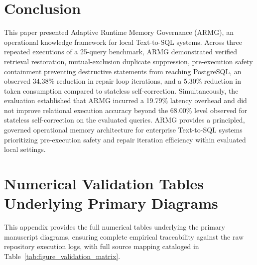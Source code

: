 \section{Conclusion}
This paper presented Adaptive Runtime Memory Governance (ARMG), an operational knowledge framework for local Text-to-SQL systems. Across three repeated executions of a 25-query benchmark, ARMG demonstrated verified retrieval restoration, mutual-exclusion duplicate suppression, pre-execution safety containment preventing destructive statements from reaching PostgreSQL, an observed 34.38\% reduction in repair loop iterations, and a 5.30\% reduction in token consumption compared to stateless self-correction. Simultaneously, the evaluation established that ARMG incurred a 19.79\% latency overhead and did not improve relational execution accuracy beyond the 68.00\% level observed for stateless self-correction on the evaluated queries. ARMG provides a principled, governed operational memory architecture for enterprise Text-to-SQL systems prioritizing pre-execution safety and repair iteration efficiency within evaluated local settings.

\appendix
\appendix
\section{Numerical Validation Tables Underlying Primary Diagrams}

This appendix provides the full numerical tables underlying the primary manuscript diagrams, ensuring complete empirical traceability against the raw repository execution logs, with full source mapping cataloged in Table~\ref{tab:figure_validation_matrix}.

